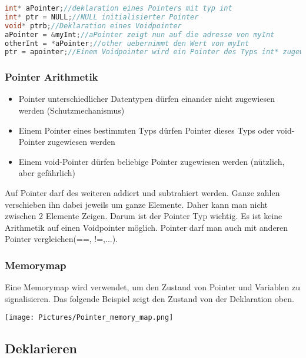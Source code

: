 \begin{lstlisting}[language = c]
int* aPointer;//deklaration eines Pointers mit typ int
int* ptr = NULL;//NULL initialisierter Pointer
void* ptrb;//Deklaration eines Voidpointer
aPointer = &myInt;//aPointer zeigt nun auf die adresse von myInt
otherInt = *aPointer;//other uebernimmt den Wert von myInt
ptr = apointer;//Einem Voidpointer wird ein Pointer des Typs int* zugewisen
\end{lstlisting}

\subsubsection{Pointer Arithmetik}

\begin{itemize}[itemsep=1pt, parsep=0pt]
    \item Pointer unterschiedlicher Datentypen dürfen einander nicht zugewiesen werden (Schutzmechanismus)
    \item Einem Pointer eines bestimmten Typs dürfen Pointer dieses Typs oder void-Pointer zugewiesen werden
    \item Einem void-Pointer dürfen beliebige Pointer zugewiesen werden (nützlich, aber gefährlich)
\end{itemize}
Auf Pointer darf des weiteren addiert und subtrahiert werden. Ganze zahlen verschieben ihn dabei jeweils um ganze Elemente. Daher kann man nicht zwischen 2 Elemente Zeigen. Darum ist der Pointer Typ wichtig. Es ist keine Arithmetik auf einen Voidpointer möglich.\newline
Pointer darf man auch mit anderen Pointer vergleichen(==, !=,...).

\subsubsection{Memorymap}

Eine Memorymap wird verwendet, um den Zustand von Pointer und Variablen zu signalisieren. Das folgende Beispiel zeigt den Zustand von der Deklaration oben.\newline
\begin{center}
    \texttt{[image: Pictures/Pointer\_memory\_map.png]}
\end{center}

\subsection{Deklarieren}

